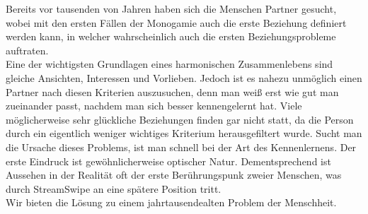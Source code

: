 Bereits vor tausenden von Jahren haben sich die Menschen Partner gesucht, wobei mit den ersten Fällen der Monogamie auch die erste Beziehung definiert werden kann, in welcher wahrscheinlich auch die ersten Beziehungsprobleme auftraten.\\
Eine der wichtigsten Grundlagen eines harmonischen Zusammenlebens sind gleiche Ansichten, Interessen und Vorlieben. Jedoch ist es nahezu unmöglich einen Partner nach diesen Kriterien  auszusuchen, denn man weiß erst wie gut man zueinander passt, nachdem man sich besser kennengelernt hat. Viele möglicherweise sehr glückliche Beziehungen finden gar nicht statt, da die Person durch ein eigentlich weniger wichtiges Kriterium herausgefiltert wurde. Sucht man die Ursache dieses Problems, ist man schnell bei der Art des Kennenlernens. Der erste Eindruck ist gewöhnlicherweise optischer Natur. Dementsprechend ist Aussehen in der Realität oft der erste Berührungspunk zweier Menschen, was durch StreamSwipe an eine spätere  Position tritt.\\
Wir bieten die Lösung zu einem jahrtausendealten Problem der Menschheit.